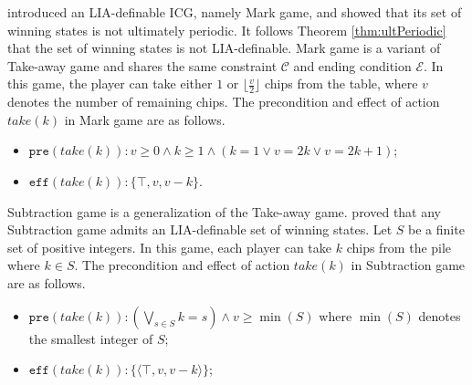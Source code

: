 \documentclass[review]{elsarticle}
\newcommand{\set}[1]{\{ #1 \}}
\newcommand{\tuple}[1]{\langle {#1} \rangle}
\newcommand{\true}{\top}
\newcommand{\constraint}{\mathcal{C}}
\newcommand{\estate}{\mathcal{E}}
\newcommand{\pre}{\mathtt{pre}}
\newcommand{\eff}{\mathtt{eff}}
\newtheorem{theorem}{Theorem}
\begin{document}
\citet{Fra2011} introduced an LIA-definable ICG, namely Mark game, and showed that its set of winning states is not ultimately periodic.
It follows Theorem \ref{thm:ultPeriodic} that the set of winning states is not LIA-definable.
Mark game is a variant of Take-away game and shares the same constraint $\constraint$ and ending condition $\estate$.
In this game, the player can take either $1$ or $\lfloor \frac{v}{2} \rfloor$ chips from the table, where $v$ denotes the number of remaining chips.
The precondition and effect of action $take(k)$ in Mark game are as follows.
\begin{itemize}
	\item $\pre(take(k)) :  v \ge 0 \land k \ge 1 \land (k = 1 \lor v = 2k \lor v = 2k + 1)$;
	\item $\eff(take(k)) : \set{\true, v, v - k}$.
\end{itemize}





Subtraction game \cite{Yag2001} is a generalization of the Take-away game.
\citet{BerCG2001} proved that any Subtraction game admits an LIA-definable set of winning states.
Let $S$ be a finite set of positive integers.
In this game, each player can take $k$ chips from the pile where $ k \in S$.
The precondition and effect of action $take(k)$ in Subtraction game are as follows.
\begin{itemize}
	\item $\pre(take(k)) : (\bigvee_{s \in S} k = s) \land v \geq \min(S)$ where $\min(S)$ denotes the smallest integer of $S$;
	\item $\eff(take(k)) : \set{\tuple{\true, v, v - k}}$;
\end{itemize}
\end{document}
